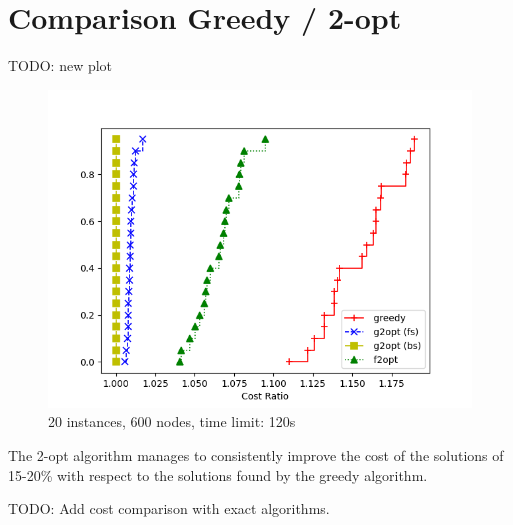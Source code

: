 \section{Comparison Greedy / 2-opt}

TODO: new plot

\begin{figure}[h]
    \centering
    \includegraphics*[width=.6\textwidth]{../plots/perfprof_heur_costs.png}
    \caption*{20 instances, 600 nodes, time limit: 120s}
\end{figure}

The 2-opt algorithm manages to consistently improve the cost of the solutions of 15-20\% with respect to the solutions found by the greedy algorithm.

TODO: Add cost comparison with exact algorithms.
